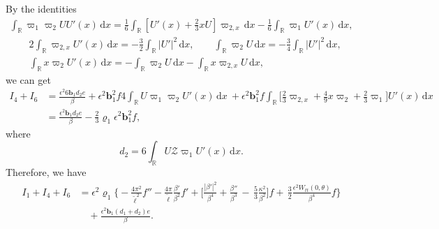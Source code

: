 \documentclass[10pt, reqno]{amsart}
\numberwithin{equation}{section}
\theoremstyle{definition}
\begin{document}
{By the identities
\begin{align*}
 \int_{{\mathbb R}} \varpi_1 \varpi_2 U U'(x)\,{\mathrm d}x =\frac1 6 \int_{\mathbb R}\left[U'(x) + \frac 23 x U \right] \varpi_{2, x} \,{\mathrm d}x
 - \frac 16\int_{\mathbb R} \varpi_1 U'(x)\,{\mathrm d}x,
\end{align*}
\begin{align*}
 & 2\int_{{\mathbb R}} \varpi_{2, x} U'(x) \,{\mathrm d}x = -\frac 32 \int_{\mathbb R} |U'|^2 \,{\mathrm d}x,
\qquad
\int_{{\mathbb R}} \varpi_{2} U \,{\mathrm d}x = - \frac 34\int_{\mathbb R} |U'|^2 \,{\mathrm d}x,
 \\[2mm]
&
 \int_{{\mathbb R}} x \varpi_{2} U'(x) \,{\mathrm d}x = - \int_{{\mathbb R}} \varpi_{2} U \,{\mathrm d}x - \int_{{\mathbb R}} x \varpi_{2, x} U \,{\mathrm d}x,
\end{align*}
we can get
\begin{align}
I_4+I_6
& =
\frac{\epsilon^2 6 {\mathbf b}_1d_2e}\beta
+\epsilon^2{\mathbf b}_1^2f 4 \int_{\mathbb R} U\varpi_1\varpi_2 U'(x) \,{\mathrm d}x\
+\epsilon^2{\mathbf b}_1^2f\int_{\mathbb R} \Big[\frac{2}{3}\varpi_{2,x} + \frac{4}{9} x\varpi_2 +\frac{2}{3}\varpi_1 \Big]U'(x) \,{\mathrm d}x\nonumber\\[2mm]
& = \frac{\epsilon^2 {\mathbf b}_1d_2e}\beta -\frac23\varrho_1\epsilon^2{\mathbf b}_1^2f,
\end{align}
where
\[d_2 =6 \int_{\mathbb R} U{\mathcal Z}\varpi_1 U'(x) \,{\mathrm d}x. \]
Therefore, we have
\begin{align} \label{S32+N03+B43intUx}
I_1+I_4+I_6
& = \epsilon^2 \varrho_1\Bigg\{ - \frac{4\pi^2}{{\tilde\ell}^2}f'' - \frac{4\pi}{\tilde\ell} \frac{\beta'}{\beta^2} f'
+ \Big[\frac{|\beta'|^2}{\beta^4}
+\frac{\beta''} {\beta^3}
\,-\,\frac53\frac{\kappa^2}{\beta^2} \Big] f + \, \frac 32\frac{\epsilon^2 W_{tt}(0, \theta)}{\beta^4} f\Bigg\}
\nonumber\\[2mm]
 & \quad+\frac {\epsilon^2 {\mathbf b}_1(d_1+d_2)e}\beta.
\end{align}

}
\end{document}
